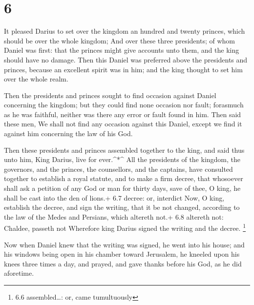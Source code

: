 \hypertarget{section-5}{%
\section{6}\label{section-5}}

 It pleased Darius to set over the kingdom an hundred and
twenty princes, which should be over the whole kingdom;  And
over these three presidents; of whom Daniel was first: that the princes
might give accounts unto them, and the king should have no damage.
 Then this Daniel was preferred above the presidents and
princes, because an excellent spirit was in him; and the king thought to
set him over the whole realm.

 Then the presidents and princes sought to find occasion
against Daniel concerning the kingdom; but they could find none occasion
nor fault; forasmuch as he was faithful, neither was there any error or
fault found in him.  Then said these men, We shall not find
any occasion against this Daniel, except we find it against him
concerning the law of his God.

 Then these presidents and princes assembled together to the
king, and said thus unto him, King Darius, live for ever.\^{}*\^{}
 All the presidents of the kingdom, the governors, and the
princes, the counsellors, and the captains, have consulted together to
establish a royal statute, and to make a firm decree, that whosoever
shall ask a petition of any God or man for thirty days, save of thee, O
king, he shall be cast into the den of lions.+ 6.7 decree: or, interdict
 Now, O king, establish the decree, and sign the writing,
that it be not changed, according to the law of the Medes and Persians,
which altereth not.+ 6.8 altereth not: Chaldee, passeth not 
Wherefore king Darius signed the writing and the decree. \footnote{6.6
  assembled\ldots: or, came tumultuously}

 Now when Daniel knew that the writing was signed, he went
into his house; and his windows being open in his chamber toward
Jerusalem, he kneeled upon his knees three times a day, and prayed, and
gave thanks before his God, as he did aforetime.

